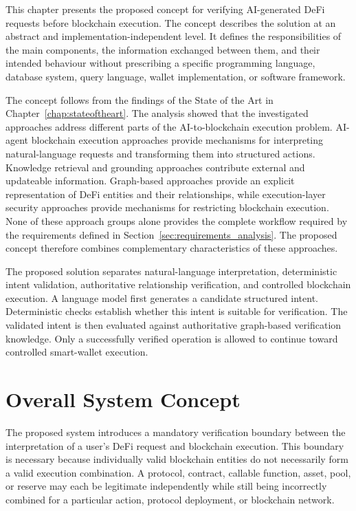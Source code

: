 This chapter presents the proposed concept for verifying AI-generated DeFi
requests before blockchain execution. The concept describes the solution at an
abstract and implementation-independent level. It defines the responsibilities
of the main components, the information exchanged between them, and their
intended behaviour without prescribing a specific programming language,
database system, query language, wallet implementation, or software framework.

The concept follows from the findings of the State of the Art in
Chapter~\ref{chap:stateoftheart}. The analysis showed that the investigated
approaches address different parts of the AI-to-blockchain execution problem.
AI-agent blockchain execution approaches provide mechanisms for interpreting
natural-language requests and transforming them into structured actions.
Knowledge retrieval and grounding approaches contribute external and updateable
information. Graph-based approaches provide an explicit representation of DeFi
entities and their relationships, while execution-layer security approaches
provide mechanisms for restricting blockchain execution. None of these
approach groups alone provides the complete workflow required by the
requirements defined in Section~\ref{sec:requirements_analysis}. The proposed
concept therefore combines complementary characteristics of these approaches.

The proposed solution separates natural-language interpretation, deterministic
intent validation, authoritative relationship verification, and controlled
blockchain execution. A language model first generates a candidate structured
intent. Deterministic checks establish whether this intent is suitable for
verification. The validated intent is then evaluated against authoritative
graph-based verification knowledge. Only a successfully verified operation is
allowed to continue toward controlled smart-wallet execution.




\section{Overall System Concept}
\label{sec:overall_system_concept}

The proposed system introduces a mandatory verification boundary between the
interpretation of a user's DeFi request and blockchain execution. This boundary
is necessary because individually valid blockchain entities do not necessarily
form a valid execution combination. A protocol, contract, callable function,
asset, pool, or reserve may each be legitimate independently while still being
incorrectly combined for a particular action, protocol deployment, or
blockchain network.

